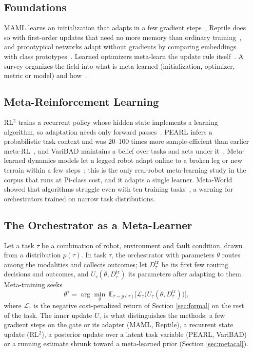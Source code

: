 \documentclass[journal]{IEEEtran}
\begin{document}
\subsection{Foundations}\label{sec:metafound}
MAML learns an initialization that adapts in a few gradient steps~\cite{Finn2017}, Reptile does so with first-order updates that need no more memory than ordinary training~\cite{Nichol2018}, and prototypical networks adapt without gradients by comparing embeddings with class prototypes~\cite{Snell2017}. Learned optimizers meta-learn the update rule itself~\cite{Andrychowicz2016}. A survey organizes the field into what is meta-learned (initialization, optimizer, metric or model) and how~\cite{Hospedales2022}.


\subsection{Meta-Reinforcement Learning}\label{sec:metarl}
RL$^2$ trains a recurrent policy whose hidden state implements a learning algorithm, so adaptation needs only forward passes~\cite{Duan2016}. PEARL infers a probabilistic task context and was 20--100 times more sample-efficient than earlier meta-RL~\cite{Rakelly2019}, and VariBAD maintains a belief over tasks and acts under it~\cite{Zintgraf2020}. Meta-learned dynamics models let a legged robot adapt online to a broken leg or new terrain within a few steps~\cite{Nagabandi2019}; this is the only real-robot meta-learning study in the corpus that runs at Pi-class cost, and it adapts a single learner. Meta-World showed that algorithms struggle even with ten training tasks~\cite{Yu2019}, a warning for orchestrators trained on narrow task distributions.


\subsection{The Orchestrator as a Meta-Learner}\label{sec:orchmeta}
Let a task $\tau$ be a combination of robot, environment and fault condition, drawn from a distribution $p(\tau)$. In task $\tau$, the orchestrator with parameters $\theta$ routes among the modalities and collects outcomes; let $D_\tau^{\mathrm{tr}}$ be its first few routing decisions and outcomes, and $U_\tau(\theta, D_\tau^{\mathrm{tr}})$ its parameters after adapting to them. Meta-training seeks
\begin{equation}
\theta^\star=\arg\min_\theta\ \mathbb{E}_{\tau\sim p(\tau)}\Big[\mathcal{L}_\tau\big(U_\tau(\theta, D_\tau^{\mathrm{tr}})\big)\Big],\label{eq:meta}
\end{equation}
where $\mathcal{L}_\tau$ is the negative cost-penalized return of Section \ref{sec:formal} on the rest of the task. The inner update $U_\tau$ is what distinguishes the methods: a few gradient steps on the gate or its adapter (MAML, Reptile), a recurrent state update (RL$^2$), a posterior update over a latent task variable (PEARL, VariBAD) or a running estimate shrunk toward a meta-learned prior (Section \ref{sec:metacal}).
\end{document}
